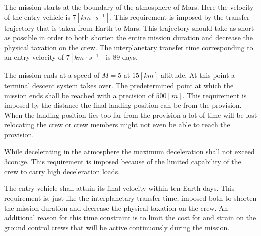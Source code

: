 The mission starts at the boundary of the atmosphere of Mars. Here the velocity of the entry vehicle is $7 \left[km \cdot s^{-1} \right]$. This requirement is imposed by the transfer trajectory that is taken from Earth to Mars. This trajectory should take as short as possible in order to both shorten the entire mission duration and decrease the physical taxation on the crew. The interplanetary transfer time corresponding to an entry velocity of $7 \left[km \cdot s^{-1} \right]$ is $89$ days. 

The mission ends at a speed of $M=5$ at $15 \left[km\right]$ altitude. At this point a terminal descent system takes over. The predetermined point at which the mission ends shall be reached with a precision of $500 \left[m\right]$. This requirement is imposed by the distance the final landing position can be from the provision. When the landing position lies too far from the provision a lot of time will be lost relocating the crew or crew members might not even be able to reach the provision.

While decelerating in the atmosphere the maximum deceleration shall not exceed 3\gls{con:ge}. This requirement is imposed because of the limited capability of the crew to carry high deceleration loads.

The entry vehicle shall attain its final velocity within ten Earth days. This requirement is, just like the interplanetary transfer time, imposed both to shorten the mission duration and decrease the physical taxation on the crew. An additional reason for this time constraint is to limit the cost for and strain on the ground control crews that will be active continuously during the mission.
